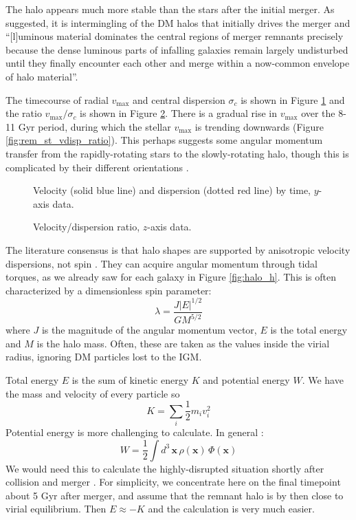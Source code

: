 \documentclass[twocolumn]{aastex63}
\begin{document}
The halo appears much more stable than the stars after the initial merger. As \citet{barnes_dynamics_1992} suggested, it is intermingling of the DM halos that initially drives the merger and ``[l]uminous material dominates the central regions of merger remnants precisely because the dense luminous parts of infalling galaxies remain largely undisturbed until they finally encounter each other and merge within a now-common envelope of halo material''.

The timecourse of radial $v_{\text{max}}$ and central dispersion $\sigma_c$ is shown in Figure \ref{fig:rem_dm_vdisp_tc} and the ratio $v_{\text{max}} / \sigma_c$ is shown in Figure \ref{fig:rem_dm_vdisp_ratio}. There is a gradual rise in $v_{\text{max}}$ over the 8-11 Gyr period, during which the stellar $v_{\text{max}}$ is trending downwards (Figure \ref{fig:rem_st_vdisp_ratio}). This perhaps suggests some angular momentum transfer from the rapidly-rotating stars to the slowly-rotating halo, though this is complicated by their different orientations .

\begin{figure}[htb!]
	\caption{Velocity (solid blue line) and dispersion (dotted red line) by time, $y$-axis data.
		\label{fig:rem_dm_vdisp_tc}}
\end{figure}


\begin{figure}[htb!]
	\caption{Velocity/dispersion ratio, $z$-axis data.
		\label{fig:rem_dm_vdisp_ratio}}
\end{figure}


The literature consensus is that halo shapes are supported by anisotropic velocity dispersions, not spin \citep{frenk_dark_2012}. They can acquire angular momentum through tidal torques, as we already saw for each galaxy in Figure \ref{fig:halo_h}. This is often characterized by a dimensionless spin parameter:
\[ \lambda = \frac{J |E|^{1/2}}{G M^{5/2}} \]
where $J$ is the magnitude of the angular momentum vector, $E$ is the total energy and $M$ is the halo mass. Often, these are taken as the values inside the virial radius, ignoring DM particles lost to the IGM.

Total energy $E$ is the sum of kinetic energy $K$ and potential energy $W$. We have the mass and velocity of every particle so 
\[ K = \sum_i \frac{1}{2} m_i v_i^2 \]
Potential energy is more challenging to calculate. In general \citep[section 2.1]{binney_galactic_2008}:
\[ W = \frac{1}{2} \int d^3\, \mathbf{x}\, \rho(\mathbf{x})\, \Phi(\mathbf{x}) \]
We would need this to calculate the highly-disrupted situation shortly after collision and merger \citep[section 8.2]{binney_galactic_2008}. For simplicity, we concentrate here on the final timepoint about 5 Gyr after merger, and assume that the remnant halo is by then close to virial equilibrium. Then $E \approx -K$ and the calculation is very much easier.
\end{document}
